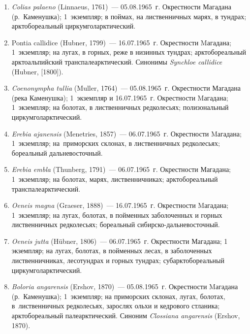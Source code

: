 \begin{enumerate}[noitemsep, leftmargin=0cm]

      \item \textit{Colias palaeno} (Linnaeus, 1761)~--- 05.08.1965~г. Окрестности Магадана (р.~Каменушка); 1~экземпляр; в поймах, на лиственничных марях, в тундрах; арктобореальный циркумголарктический.

      \item Pontia callidice (Hubner, 1799)~--- 16.07.1965~г. Окрестности Mагадана; 1~экземпляр; на лугах, в горных, реже в низинных тундрах; арктобореальный арктоальпийский транспалеарктический. Синонимы \textit{Synchloe callidice} (Hubner, [1800]).


      \item \textit{Coenonympha tullia} (Muller, 1764)~--- 05.08.1965~г. Окрестности Магадана (река Каменушка); 1~экземпляр и 16.07.1965~г. Окрестности Mагадана; 1~экземпляр; на болотах, в лиственничных редколесьях; полизональный циркумголарктический.

      \item \textit{Erebia ajanensis} (Menetries, 1857)~--- 06.07.1965~г. Окрестности Mагадана; 1~экземпляр; на~приморских склонах, в лиственничных редколесьях; бореальный дальневосточный.

      \item  \textit{Erebia embla} (Thunberg, 1791)~--- 06.07.1965~г. Окрестности Магадана; 1~экземпляр; на болотах, марях, лиственничниках; арктобореальный транспалеарктический.

      \item \textit{Oeneis magna} (Graeser, 1888)~--- 16.07.1965~г. Окрестности Mагадана; 1~экземпляр; на лугах, болотах, в пойменных заболоченных и горных лиственничных редколесьях; бореальный сибирско-дальневосточный.

      \item \textit{Oeneis jutta} (Hübner, 1806)~--- 06.07.1965~г. Окрестности Магадана; 1 экземпляр; на лугах, болотах, в пойменных лесах, в заболоченных лиственничниках, лесотундрах и горных тундрах; субарктобореальный циркумголарктический.


      \item \textit{Boloria angarensis} (Ershov, 1870)~--- 05.08.1965~г. Окрестности Mагадана (р.~Каменушка); 1~экземпляр; на приморских склонах, лугах, болотах, в~лиственничных редколесьях, зарослях ольхи и кедрового стланика; арктобореальный палеарктический. Синоним \textit{Clossiana angarensis} (Ershov, 1870).
\end{enumerate}


